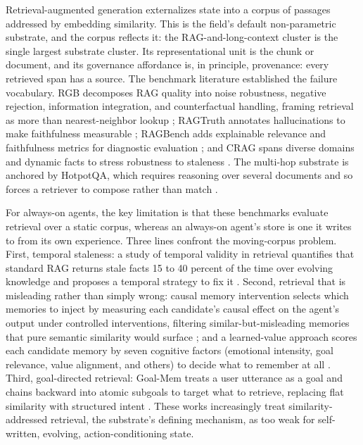 Retrieval-augmented generation externalizes state into a corpus of passages addressed by embedding similarity. This is the field's default non-parametric substrate, and the corpus reflects it: the RAG-and-long-context cluster is the single largest substrate cluster. Its representational unit is the chunk or document, and its governance affordance is, in principle, provenance: every retrieved span has a source. The benchmark literature established the failure vocabulary. RGB decomposes RAG quality into noise robustness, negative rejection, information integration, and counterfactual handling, framing retrieval as more than nearest-neighbor lookup \citep{chen2023benchmarkinglargelanguagemodels}; RAGTruth annotates hallucinations to make faithfulness measurable \citep{niu2024ragtruthhallucinationcorpusdeveloping}; RAGBench adds explainable relevance and faithfulness metrics for diagnostic evaluation \citep{friel2025ragbenchexplainablebenchmarkretrievalaugmented}; and CRAG spans diverse domains and dynamic facts to stress robustness to staleness \citep{yang2024cragcomprehensiverag}. The multi-hop substrate is anchored by HotpotQA, which requires reasoning over several documents and so forces a retriever to compose rather than match \citep{yang2018hotpotqa}.

For always-on agents, the key limitation is that these benchmarks evaluate retrieval over a static corpus, whereas an always-on agent's store is one it writes to from its own experience. Three lines confront the moving-corpus problem. First, temporal staleness: a study of temporal validity in retrieval quantifies that standard RAG returns stale facts 15 to 40 percent of the time over evolving knowledge and proposes a temporal strategy to fix it \citep{yadav2026temporalvalidityretrieval}. Second, retrieval that is misleading rather than simply wrong: causal memory intervention selects which memories to inject by measuring each candidate's causal effect on the agent's output under controlled interventions, filtering similar-but-misleading memories that pure semantic similarity would surface \citep{srivastava2026causalmemory}; and a learned-value approach scores each candidate memory by seven cognitive factors (emotional intensity, goal relevance, value alignment, and others) to decide what to remember at all \citep{chen2026learningwhattoremember}. Third, goal-directed retrieval: Goal-Mem treats a user utterance as a goal and chains backward into atomic subgoals to target what to retrieve, replacing flat similarity with structured intent \citep{liang2026goalmemragmemory}. These works increasingly treat similarity-addressed retrieval, the substrate's defining mechanism, as too weak for self-written, evolving, action-conditioning state.

